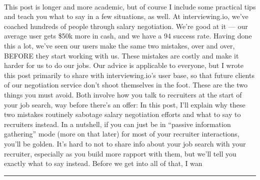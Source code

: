 \documentclass[10pt,a4paper]{article}
\begin{document}
\begin{multicols*}{2}
\paragraph{}
 This post is longer and more academic, but of course I include some practical tips and teach you what to say in a few situations, as well.
At interviewing.io, we’ve coached hundreds of people through salary negotiation. We’re good at it — our average user gets \$50k more in cash, and we have a 94 success rate.
Having done this a lot, we’ve seen our users make the same two mistakes, over and over, BEFORE they start working with us. These mistakes are costly and make it harder for us to do our jobs. Our advice is applicable to everyone, but I wrote this post primarily to share with interviewing.io’s user base, so that future clients of our negotiation service don’t shoot themselves in the foot.
These are the two things you must avoid. Both involve how you talk to recruiters at the start of your job search, way before there’s an offer:
In this post, I’ll explain why these two mistakes routinely sabotage salary negotiation efforts and what to say to recruiters instead. In a nutshell, if you can just be in “passive information gathering” mode (more on that later) for most of your recruiter interactions, you’ll be golden. It’s hard to not to share info about your job search with your recruiter, especially as you build more rapport with them, but we’ll tell you exactly what to say instead.
Before we get into all of that, I wan
\par\noindent\textcolor{red}{\rule{\linewidth}{0.2mm}}
\vfill
\null
\noindent\begin{minipage}{\linewidth}

\end{minipage}
\end{multicols*}
\end{document}
